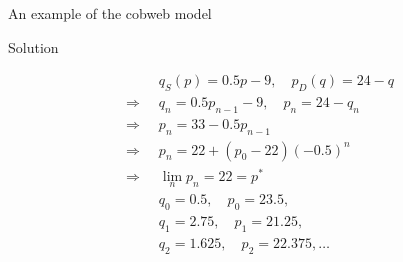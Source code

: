 \documentclass[9pt]{beamer}
\begin{document}
\begin{frame}{An example of the cobweb model}
\begin{block}{Solution}
\begin{minipage}{0.5\textwidth}
{
        }    
        \end{minipage}
        \begin{minipage}{0.45\textwidth}
        \vspace{-0.4cm}
        
            \begin{align*}
                                &\;\; q_S(p) = 0.5p - 9, \quad p_D(q) = 24 - q \\
                \Longrightarrow &\;\; q_n = 0.5p_{n-1} - 9, \quad p_n = 24 - q_n \\
                \Longrightarrow &\;\; p_n = 33 - 0.5p_{n-1} \\
                \Longrightarrow &\;\; p_n = 22 + (p_0 - 22)(-0.5)^n \\
                \Longrightarrow &\;\; \lim_{n} p_n = 22 = p^* \\
                                &\;\; q_0 = 0.5,\quad p_0 = 23.5, \\ 
                                &\;\; q_1 = 2.75,\quad p_1 = 21.25, \\
                                &\;\; q_2 = 1.625,\quad p_2 = 22.375, \dots  
            \end{align*}     
        \end{minipage}
        
    \end{block}

\end{frame}
\end{document}
